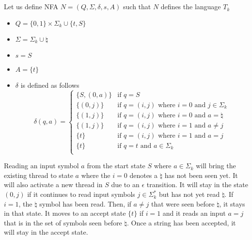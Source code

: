 \documentclass[11pt]{article}
\begin{document}
\subsection*{}
Let us define NFA $N=(Q,\Sigma,\delta,s,A)$ such that $N$ defines the language $T_k$
\begin{itemize}
	\item $Q=\{0, 1\} \times \Sigma_k \cup\{t,S\}$
	\item $\Sigma=\Sigma_k \cup \natural$
	\item $s=S$
	\item $A=\{t\}$
	\item $\delta$ is defined as follows \\ \[\delta(q,a)=\begin{cases}
		\{S, (0,a)\} & \text{if }q=S \\
        \{(0, j)\} & \text{if }q=(i, j)\text{ where }i=0\text{ and }j\in\Sigma_k \\
		\{(1,j)\} & \text{if }q=(i, j)\text{ where }i=0\text{ and }a=\natural \\
		\{(1,j)\} & \text{if }q=(i, j)\text{ where }i=1\text{ and }a\neq j \\
		\{t\} & \text{if }q=(i, j)\text{ where }i=1\text{ and }a=j \\
		\{t\} & \text{if }q=t\text{ and }a\in\Sigma_k\\
	\end{cases}\]
\end{itemize}
Reading an input symbol $a$ from the start state $S$ where $a \in\Sigma_k$ will bring the existing thread to state $a$ where the $i=0$ denotes a $\natural$ has not been seen yet. It will also activate a new thread in $S$ due to an $\epsilon$ transition. It will stay in the state $(0, j)$ if it continues to read input symbols $j\in \Sigma_k^*$ but has not yet read $\natural$.
If $i=1$, the $\natural$ symbol has been read. Then, if $a\neq j$ that were seen before $\natural$, it stays in that state. It moves to an accept state $\{t\}$ if $i=1$ and it reads an input $a=j$ that is in the set of symbols seen before $\natural$. Once a string has been accepted, it will stay in the accept state. 
\end{document}
